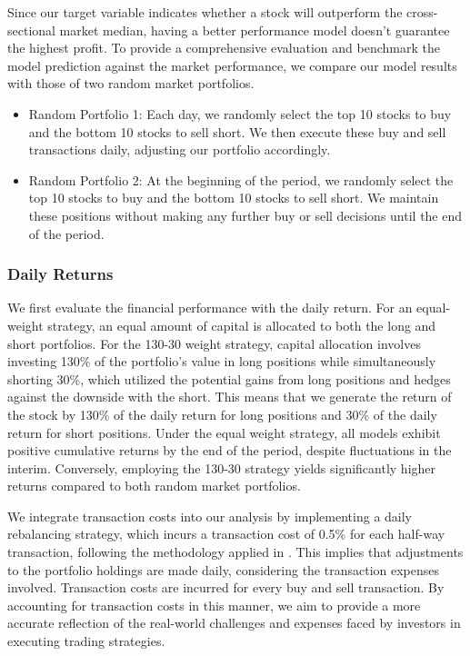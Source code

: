 \documentclass{article}
\begin{document}
Since our target variable indicates whether a stock will outperform the cross-sectional market median, having a better performance model doesn't guarantee the highest profit. To provide a comprehensive evaluation and benchmark the model prediction against the market performance, we compare our model results with those of two random market portfolios. 

\begin{itemize}
  \item Random Portfolio 1: Each day, we randomly select the top 10 stocks to buy and the bottom 10 stocks to sell short. We then execute these buy and sell transactions daily, adjusting our portfolio accordingly.
  \item Random Portfolio 2: At the beginning of the period, we randomly select the top 10 stocks to buy and the bottom 10 stocks to sell short. We maintain these positions without making any further buy or sell decisions until the end of the period.
\end{itemize}

\subsubsection{Daily Returns}
We first evaluate the financial performance with the daily return. For an equal-weight strategy, an equal amount of capital is allocated to both the long and short portfolios. For the 130-30 weight strategy, capital allocation involves investing 130\% of the portfolio's value in long positions while simultaneously shorting 30\%, which utilized the potential gains from long positions and hedges against the downside with the short. This means that we generate the return of the stock by 130\% of the daily return for long positions and 30\% of the daily return for short positions. Under the equal weight strategy, all models exhibit positive cumulative returns by the end of the period, despite fluctuations in the interim. Conversely, employing the 130-30 strategy yields significantly higher returns compared to both random market portfolios. 

We integrate transaction costs into our analysis by implementing a daily rebalancing strategy, which incurs a transaction cost of 0.5\% for each half-way transaction, following the methodology applied in \cite{fischer2018deep}. This implies that adjustments to the portfolio holdings are made daily, considering the transaction expenses involved. Transaction costs are incurred for every buy and sell transaction. By accounting for transaction costs in this manner, we aim to provide a more accurate reflection of the real-world challenges and expenses faced by investors in executing trading strategies.
\end{document}

